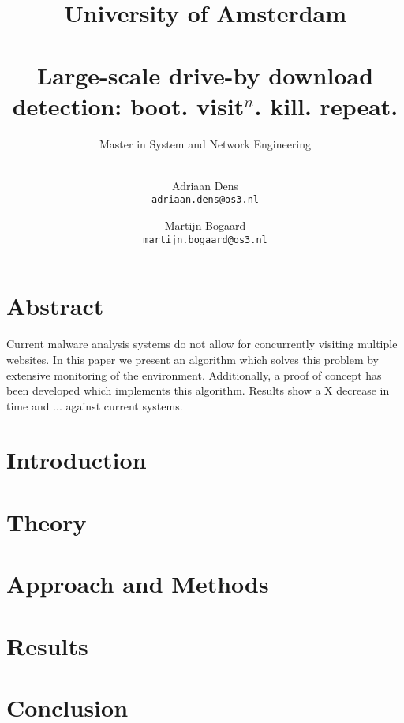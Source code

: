 \documentclass{scrartcl}
\title{University of Amsterdam \\[1cm] \horizontalrule{1pt}\\[0.5cm]Large-scale drive-by download detection: boot. visit$^n$. kill. repeat.}
\subtitle{Master in System and Network Engineering \\[0.5cm] \horizontalrule{1pt} \\[10cm] }
\author{
  Adriaan Dens\\
   \texttt{adriaan.dens@os3.nl}
  \and
  Martijn Bogaard\\
   \texttt{martijn.bogaard@os3.nl}
}
\begin{document}

\maketitle

\clearpage

\section*{Abstract}

Current malware analysis systems do not allow for concurrently visiting multiple websites. In this paper we present an algorithm which solves this problem by extensive monitoring of the environment. Additionally, a proof of concept has been developed which implements this algorithm. Results show a X decrease in time and ... against current systems.

\clearpage

\tableofcontents

\clearpage


\section{Introduction}


\clearpage

\section{Theory}


\clearpage

\section{Approach and Methods}


\clearpage

\section{Results}


\clearpage

\section{Conclusion}

\end{document}

